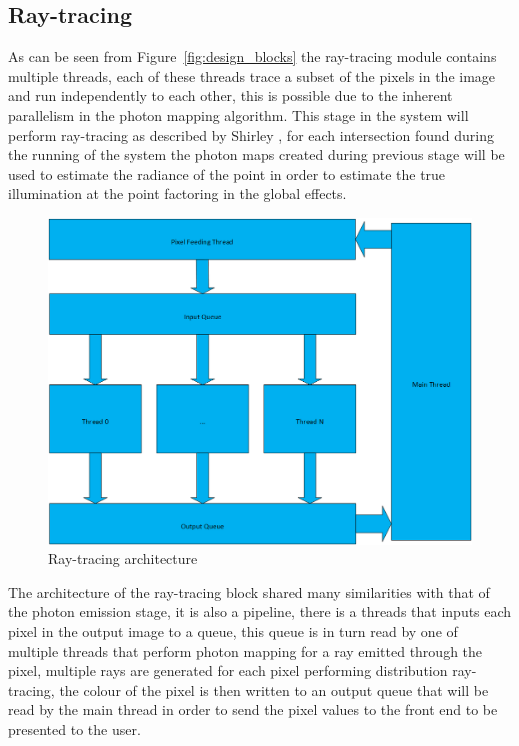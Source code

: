 \subsection{Ray-tracing}
As can be seen from Figure~\ref{fig:design_blocks} the ray-tracing module contains multiple threads, each of these
threads trace a subset of the pixels in the image and run independently to each other, this is possible due
to the inherent parallelism in the photon mapping algorithm. This stage in the system will perform ray-tracing
as described by Shirley \cite{shirley-dist}, for each intersection found during the running of the system the photon
maps created during previous stage will be used to estimate the radiance of the point in order to estimate the
true illumination at the point factoring in the global effects.

\begin{figure}
\centering
\includegraphics{./images/pixel_threading.png}
\caption{Ray-tracing architecture}
\label{fig:pixel_generation}
\end{figure}

The architecture of the ray-tracing block shared many similarities with that of the photon emission stage,
it is also a pipeline, there is a threads that inputs each pixel in the output image to a queue, this queue
is in turn read by one of multiple threads that perform photon mapping for a ray emitted through the pixel,
multiple rays are generated for each pixel performing distribution ray-tracing, the colour of the pixel is
then written to an output queue that will be read by the main thread in order to send the pixel values to
the front end to be presented to the user.

